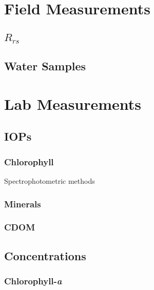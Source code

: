 \begin{appendices}
\chapter{Field Measurements}
\label{ch:fieldmea}
\section{$R_{rs}$}
\section{Water Samples}

\chapter{Lab Measurements}
\label{ch:labmea} 
\section{IOPs}
\subsection{Chlorophyll}
Spectrophotometric methods
\subsection{Minerals}

\subsection{CDOM}
\section{Concentrations}
\subsection{Chlorophyll-{\it a}}


\end{appendices}
